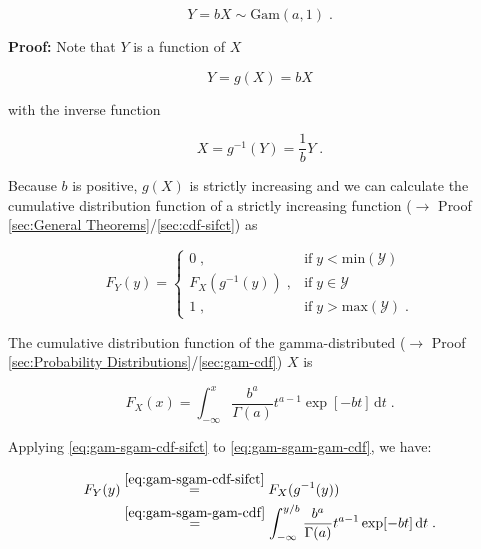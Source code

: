 \documentclass[a4paper,12pt,twoside]{book}
\begin{document}
\begin{equation} \label{eq:gam-sgam-Y-snorm}
Y = b X \sim \mathrm{Gam}(a,1) \; .
\end{equation}


\vspace{1em}
\textbf{Proof:} Note that $Y$ is a function of $X$

\begin{equation} \label{eq:gam-sgam-Y-X}
Y = g(X) = b X
\end{equation}

with the inverse function

\begin{equation} \label{eq:gam-sgam-X-Y}
X = g^{-1}(Y) = \frac{1}{b} Y \; .
\end{equation}

Because $b$ is positive, $g(X)$ is strictly increasing and we can calculate the cumulative distribution function of a strictly increasing function ($\rightarrow$ Proof \ref{sec:General Theorems}/\ref{sec:cdf-sifct}) as

\begin{equation} \label{eq:gam-sgam-cdf-sifct}
F_Y(y) = \left\{
\begin{array}{rl}
0 \; , & \text{if} \; y < \mathrm{min}(\mathcal{Y}) \\
F_X(g^{-1}(y)) \; , & \text{if} \; y \in \mathcal{Y} \\
1 \; , & \text{if} \; y > \mathrm{max}(\mathcal{Y}) \; .
\end{array}
\right.
\end{equation}

The cumulative distribution function of the gamma-distributed ($\rightarrow$ Proof \ref{sec:Probability Distributions}/\ref{sec:gam-cdf}) $X$ is

\begin{equation} \label{eq:gam-sgam-gam-cdf}
F_X(x) = \int_{-\infty}^{x} \frac{b^a}{\Gamma(a)} t^{a-1} \exp[-b t] \, \mathrm{d}t \; .
\end{equation}

Applying \eqref{eq:gam-sgam-cdf-sifct} to \eqref{eq:gam-sgam-gam-cdf}, we have:

\begin{equation} \label{eq:gam-sgam-Y-cdf-s1}
\begin{split}
F_Y(y) &\overset{\eqref{eq:gam-sgam-cdf-sifct}}{=} F_X(g^{-1}(y)) \\
&\overset{\eqref{eq:gam-sgam-gam-cdf}}{=} \int_{-\infty}^{y/b} \frac{b^a}{\Gamma(a)} t^{a-1} \exp[-b t] \, \mathrm{d}t \; .
\end{split}
\end{equation}
\end{document}
